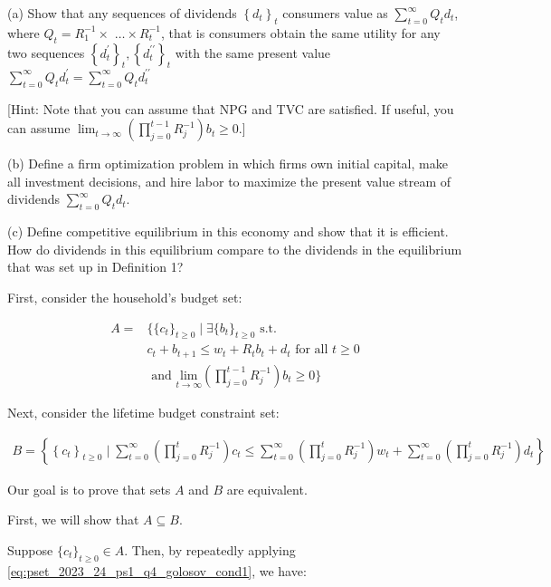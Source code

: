 (a) Show that any sequences of dividends $\left\{d_t\right\}_t$ consumers value as $\sum_{t=0}^{\infty} Q_t d_t$, where $Q_t=R_1^{-1} \times$ $\ldots \times R_t^{-1}$, that is consumers obtain the same utility for any two sequences $\left\{d_t^{\prime}\right\}_t,\left\{d_t^{\prime \prime}\right\}_t$ with the same present value $\sum_{t=0}^{\infty} Q_t d_t^{\prime}=\sum_{t=0}^{\infty} Q_t d_t^{\prime \prime}$

[Hint: Note that you can assume that NPG and TVC are satisfied. If useful, you can assume $\lim _{t \rightarrow \infty}\left(\prod_{j=0}^{t-1} R_j^{-1}\right) b_t \geq 0$.]

(b) Define a firm optimization problem in which firms own initial capital, make all investment decisions, and hire labor to maximize the present value stream of dividends $\sum_{t=0}^{\infty} Q_t d_t$.

(c) Define competitive equilibrium in this economy and show that it is efficient. How do dividends in this equilibrium compare to the dividends in the equilibrium that was set up in Definition 1?


First, consider the household's budget set:

\begin{align}
    A = &\{\{c_t\}_{t \geq 0} \mid \exists \{b_t\}_{t \geq 0} \text{ s.t. } \\
    &c_t + b_{t+1} \leq w_t + R_tb_t + d_t \text{ for all } t \geq 0 \label{eq:pset_2023_24_ps1_q4_golosov_cond1} \\
    &\text{ and } \underset{t \rightarrow \infty}{\text{lim}} (\prod_{j=0}^{t-1} R_j^{-1})b_t \geq 0\} \label{eq:pset_2023_24_ps1_q4_golosov_cond2}
\end{align}

Next, consider the lifetime budget constraint set:

\begin{align}
    B=\left\{\left\{c_t\right\}_{t \geq 0} \mid \sum_{t=0}^{\infty}\left(\prod_{j=0}^t R_j^{-1}\right) c_t \leq \sum_{t=0}^{\infty}\left(\prod_{j=0}^t R_j^{-1}\right) w_t+\sum_{t=0}^{\infty}\left(\prod_{j=0}^t R_j^{-1}\right) d_t\right\}
\end{align}

Our goal is to prove that sets $A$ and $B$ are equivalent.

First, we will show that $A \subseteq B$. 

Suppose $\{c_t\}_{t \geq 0} \in A$. 
Then, by repeatedly applying \eqref{eq:pset_2023_24_ps1_q4_golosov_cond1}, we have:

